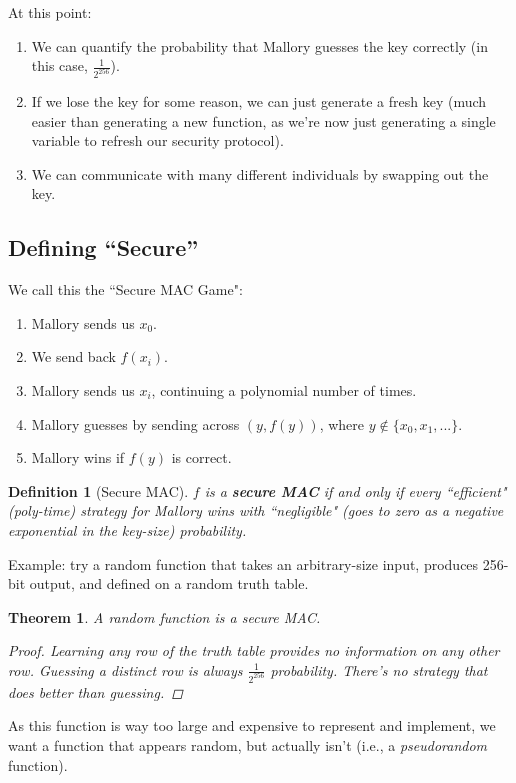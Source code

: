 \documentclass[12pt]{article}
\newtheorem{thm}{Theorem}[section]
\newtheorem*{mydef}{Definition}
\begin{document}
At this point:
\begin{enumerate}
\item We can quantify the probability that Mallory guesses the key correctly (in this case, $\frac{1}{2^{256}}$).
\item If we lose the key for some reason, we can just generate a fresh key (much easier than generating a new function, as we're now just generating a single variable to refresh our security protocol).
\item We can communicate with many different individuals by swapping out the key.
\end{enumerate}

\subsection*{Defining ``Secure''}

We call this the ``Secure MAC Game":
\begin{enumerate}
\item Mallory sends us $x_0$.
\item We send back $f(x_i)$.
\item Mallory sends us $x_i$, continuing a polynomial number of times.
\item Mallory guesses by sending across $(y, f(y))$, where $y \not \in \{x_0, x_1, ... \}$.
\item Mallory wins if $f(y)$ is correct.
\end{enumerate}

\begin{mydef}[Secure MAC]
$f$ is a \textbf{secure MAC} if and only if every ``efficient" (poly-time) strategy for Mallory wins with ``negligible" (goes to zero as a negative exponential in the key-size) probability.
\end{mydef}

Example: try a random function that takes an arbitrary-size input, produces 256-bit output, and defined on a random truth table.

\begin{thm}
A random function is a secure MAC.
\begin{proof}
Learning any row of the truth table provides no information on any other row. Guessing a distinct row is always $\frac{1}{2^{256}}$ probability. There's no strategy that does better than guessing.
\end{proof}
\end{thm}

As this function is way too large and expensive to represent and implement, we want a function that appears random, but actually isn't (i.e., a \textit{pseudorandom} function).
\end{document}
